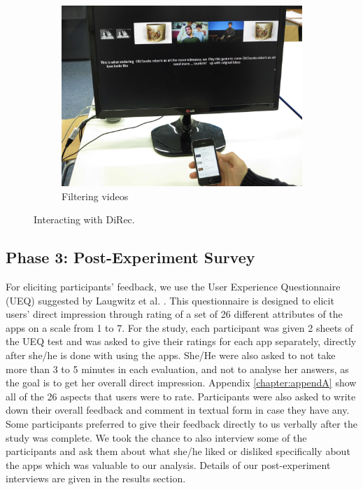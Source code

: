 \begin{figure}
    \begin{subfigure}[b]{0.3\textwidth}
        \includegraphics[width=\textwidth]{figures/IMG_6810}
        \caption{Filtering videos}
        \label{fig:figure52c}
    \end{subfigure}
   \caption{Interacting with DiRec.}\label{fig:figure52}
\end{figure}
 
\subsection{Phase 3: Post-Experiment Survey}
For eliciting participants' feedback, we use the User Experience Questionnaire
(UEQ) suggested by Laugwitz et al.
\cite{laugwitz2008construction}. This questionnaire is designed to elicit users'
direct impression through rating of a set of 26 different attributes of the
apps on a scale from 1 to 7. For the study, each participant was given 2
sheets of the UEQ test and was asked to give their ratings for each app
separately, directly after she/he is done with using the apps. She/He were also
asked to not take more than 3 to 5 minutes in each evaluation, and not to analyse her
answers, as the goal is to get her overall direct impression. Appendix \ref{chapter:appendA}
show all of the 26 aspects that users were to rate. Participants were also asked
to write down their overall feedback and comment in textual form in case they
have any. Some participants preferred to give their feedback directly to us
verbally after the study was complete. We took the chance to also interview some
of the participants and ask them about what she/he liked or disliked
specifically about the apps which was valuable to our analysis. Details of our
post-experiment interviews are given in the results section.

